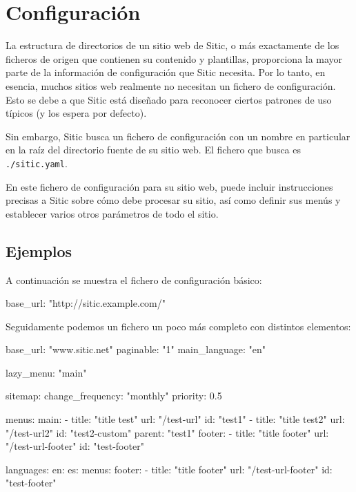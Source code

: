 
\section{Configuración}

La estructura de directorios de un sitio web de Sitic, o más exactamente de los ficheros de origen
que contienen su contenido y plantillas, proporciona la mayor parte de la información de configuración
que Sitic necesita. Por lo tanto, en esencia, muchos sitios web realmente no necesitan un fichero de
configuración. Esto se debe a que Sitic está diseñado para reconocer ciertos patrones de uso típicos
(y los espera por defecto).

Sin embargo, Sitic busca un fichero de configuración con un nombre en particular en la raíz del directorio
fuente de su sitio web. El fichero que busca es \texttt{./sitic.yaml}.

En este fichero de configuración para su sitio web, puede incluir instrucciones precisas a Sitic sobre cómo
debe procesar su sitio, así como definir sus menús y establecer varios otros parámetros de todo el sitio.

\subsection{Ejemplos}

A continuación se muestra el fichero de configuración básico:

\begin{yamlcode}
base_url: "http://sitic.example.com/"
\end{yamlcode}

Seguidamente podemos un fichero un poco más completo con distintos elementos:

\begin{yamlcode}
base_url: "www.sitic.net"
paginable: "1"
main_language: "en"

lazy_menu: "main"

sitemap:
    change_frequency: "monthly"
    priority: 0.5

menus:
    main:
        - title: "title test"
          url: "/test-url"
          id: "test1"
        - title: "title test2"
          url: "/test-url2"
          id: "test2-custom"
          parent: "test1"
    footer:
        - title: "title footer"
          url: "/test-url-footer"
          id: "test-footer"


languages:
    en:
    es:
        menus:
            footer:
                - title: "title footer"
                  url: "/test-url-footer"
                  id: "test-footer"
\end{yamlcode}

